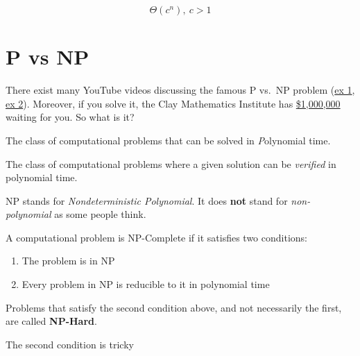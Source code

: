 \documentclass[main.tex]{subfiles}
\begin{document}
\begin{defn}[Exponential]
	\[\Theta(c^n),\ c > 1\]
\end{defn}

\section{P vs NP}

There exist many YouTube videos discussing the famous P vs.\ NP problem (\href{https://www.youtube.com/watch?v=EHp4FPyajKQ}{ex 1}, \href{https://www.youtube.com/watch?v=YX40hbAHx3s}{ex 2}). Moreover, if you solve it, the Clay Mathematics Institute has \href{https://www.claymath.org/millennium-problems/p-vs-np-problem}{\$1,000,000} waiting for you. So what is it?

\begin{defn}[P]
	The class of computational problems that can be solved in \textit{P}olynomial time.
\end{defn}

\begin{defn}[NP]
	The class of computational problems where a given solution can be \textit{verified} in polynomial time.
\end{defn}

\begin{rem}
	NP stands for \textit{Nondeterministic Polynomial}. It does \textbf{not} stand for \textit{non-polynomial} as some people think.
\end{rem}



\begin{defn}[Reductions]
	
\end{defn}

\begin{defn}[NP-Complete]
	A computational problem is NP-Complete if it satisfies two conditions:
	\begin{enumerate}
		\item The problem is in NP
		\item Every problem in NP is reducible to it in polynomial time
	\end{enumerate}
\end{defn}

\begin{rem}
	Problems that satisfy the second condition above, and not necessarily the first, are called \textbf{NP-Hard}.
\end{rem}

The second condition is tricky
\end{document}
